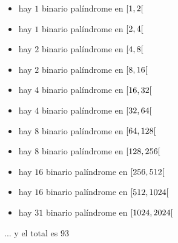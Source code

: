 \begin{itemize}
	\item{hay $1$ binario palíndrome en $\interval[open right]{1}{2}$}
	\item{hay $1$ binario palíndrome en $\interval[open right]{2}{4}$}
	\item{hay $2$ binario palíndrome en $\interval[open right]{4}{8}$}
	\item{hay $2$ binario palíndrome en $\interval[open right]{8}{16}$}
	\item{hay $4$ binario palíndrome en $\interval[open right]{16}{32}$}
	\item{hay $4$ binario palíndrome en $\interval[open right]{32}{64}$}
	\item{hay $8$ binario palíndrome en $\interval[open right]{64}{128}$}
	\item{hay $8$ binario palíndrome en $\interval[open right]{128}{256}$}
	\item{hay $16$ binario palíndrome en $\interval[open right]{256}{512}$}
	\item{hay $16$ binario palíndrome en $\interval[open right]{512}{1024}$}
	\item{hay $31$ binario palíndrome en $\interval[open right]{1024}{2024}$}
\end{itemize}

... y el total es $93$

